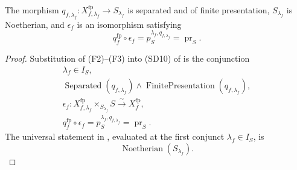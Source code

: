 \begin{lemma}
  \label{lemma:nagata-final-descended-model}
  \checked\lean{}

  The morphism
  $q_{f,\lambda_f}\colon X_{f,\lambda_f}^{\mathrm{fp}}\to S_{\lambda_f}$
  is separated and of
  finite presentation, $S_{\lambda_f}$ is Noetherian, and $\epsilon_f$ is an
  isomorphism satisfying
  \[
    q_f^{\mathrm{fp}}\circ\epsilon_f
      =p_S^{\lambda_f,q_{f,\lambda_f}}
      =\operatorname{pr}_S.
  \]
\end{lemma}

\begin{proof}
  Substitution of (F2)--(F3) into (SD10) of
   is the conjunction
  \[
  \begin{gathered}
    \lambda_f\in I_S,\\
    \operatorname{Separated}(q_{f,\lambda_f})\wedge
      \operatorname{FinitePresentation}(q_{f,\lambda_f}),\\
    \epsilon_f\colon
      X_{f,\lambda_f}^{\mathrm{fp}}\times_{S_{\lambda_f}}S
        \xrightarrow{\sim}X_f^{\mathrm{fp}},\\
    q_f^{\mathrm{fp}}\circ\epsilon_f
      =p_S^{\lambda_f,q_{f,\lambda_f}}
      =\operatorname{pr}_S.
  \end{gathered}
  \]
  The universal statement in
  , evaluated at
  the first conjunct \(\lambda_f\in I_S\), is
  \[
    \operatorname{Noetherian}(S_{\lambda_f}).
  \]
\end{proof}

